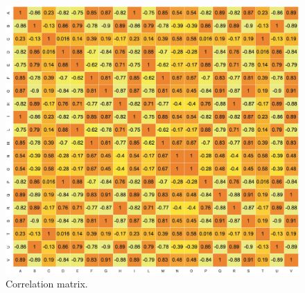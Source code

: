 \begin{appendices}
\begin{figure}[H]
    \includegraphics[scale = 0.5]{Images/preprocessing_phase/correlation_matrix_2.eps}
    \caption{Correlation matrix.}
    \label{fig:corr_mat}
\end{figure}
\end{appendices}
